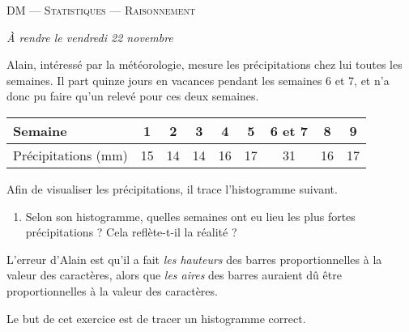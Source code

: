 \documentclass[11pt]{article}
\begin{document}
\begin{center}
  {\large
    DM
    ---
    \textsc{Statistiques --- Raisonnement}
  }
\end{center}

\emph{À rendre le vendredi 22 novembre}

\begin{exercice}
  Alain, intéressé par la météorologie, mesure les précipitations chez lui
  toutes les semaines. Il part quinze jours en vacances pendant les semaines 6
  et 7, et n'a donc pu faire qu'un relevé pour ces deux semaines.

  \hspace{-2.5em}\begin{tabular}{l|cccccccc}
    Semaine & 1 & 2 & 3 & 4 & 5 & 6 et 7 & 8 & 9 \\
    \hline
    Précipitations (mm) & 15 & 14 & 14 & 16 & 17 & 31 & 16 & 17 \\
  \end{tabular}

  Afin de visualiser les précipitations, il trace l'histogramme suivant.

  \begin{center}
  \end{center}
  \begin{enumerate}[(1)]
    \item Selon son histogramme, quelles semaines ont eu lieu les plus fortes précipitations ? Cela reflète-t-il la réalité ?
  \end{enumerate}
  L'erreur d'Alain est qu'il a fait \emph{les hauteurs} des barres proportionnelles à
  la valeur des caractères, alors que \emph{les aires} des barres auraient dû être
  proportionnelles à la valeur des caractères.

  Le but de cet exercice est de tracer un histogramme correct.


\end{exercice}
\end{document}
